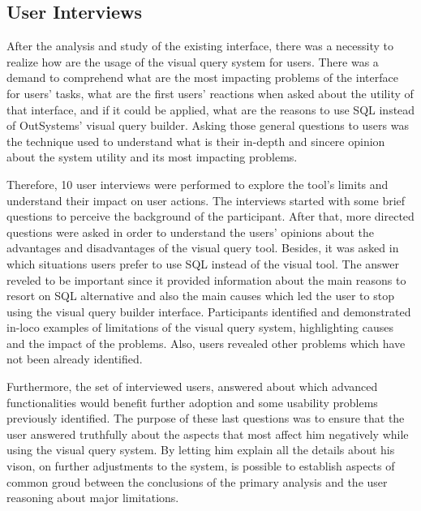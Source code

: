 \subsection{User Interviews}
\label{subsec:user_interviews}

After the analysis and study of the existing interface, there was a necessity to realize how are the usage of the visual query system for users. There was a demand to comprehend what are the most impacting problems of the interface for users' tasks, what are the first users' reactions when asked about the utility of that interface, and if it could be applied, what are the reasons to use \gls{SQL} instead of OutSystems' visual query builder. Asking those general questions to users was the technique used to understand what is their in-depth and sincere opinion about the system utility and its most impacting problems.

Therefore, 10 user interviews were performed to explore the tool's limits and understand their impact on user actions. The interviews started with some brief questions to perceive the background of the participant. After that, more directed questions were asked in order to understand the users' opinions about the advantages and disadvantages of the visual query tool. Besides, it was asked in which situations users prefer to use \gls{SQL} instead of the visual tool. The answer reveled to be important since it provided information about the main reasons to resort on \gls{SQL} alternative and also the main causes which led the user to stop using the visual query builder interface. Participants identified and demonstrated in-loco examples of limitations of the visual query system, highlighting causes and the impact of the problems. Also, users revealed other problems which have not been already identified.

Furthermore, the set of interviewed users, answered about which advanced functionalities would benefit further adoption and some usability problems previously identified. The purpose of these last questions was to ensure that the user answered truthfully about the aspects that most affect him negatively while using the visual query system. By letting him explain all the details about his vison, on further adjustments to the system, is possible to establish aspects of common groud between the conclusions of the primary analysis and the user reasoning about major limitations.

